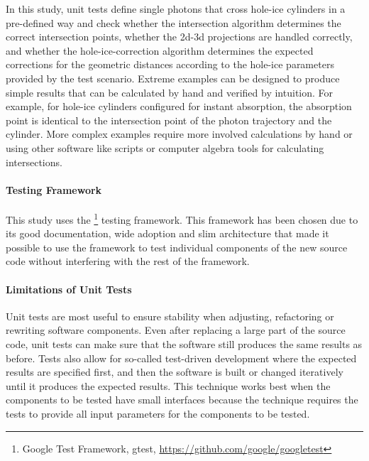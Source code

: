 In this study, unit tests define single photons that cross hole-ice cylinders in a pre-defined way and check whether the intersection algorithm determines the correct intersection points, whether the 2d-3d projections are handled correctly, and whether the hole-ice-correction algorithm determines the expected corrections for the geometric distances according to the hole-ice parameters provided by the test scenario.
Extreme examples can be designed to produce simple results that can be calculated by hand and verified by intuition. For example, for hole-ice cylinders configured for instant absorption, the absorption point is identical to the intersection point of the photon trajectory and the cylinder.
More complex examples require more involved calculations by hand or using other software like  scripts or computer algebra tools for calculating intersections.



\paragraph{Testing Framework}
This study uses the \footnote{Google Test Framework, gtest, \url{https://github.com/google/googletest}} testing framework.
This framework has been chosen due to its good documentation, wide adoption and slim architecture that made it possible to use the framework to test individual components of the new source code without interfering with the rest of the \icesim framework.


\paragraph{Limitations of Unit Tests}
Unit tests are most useful to ensure stability when adjusting, refactoring or rewriting software components. Even after replacing a large part of the source code, unit tests can make sure that the software still produces the same results as before.
Tests also allow for so-called test-driven development where the expected results are specified first, and then the software is built or changed iteratively until it produces the expected results.
This technique works best when the components to be tested have small interfaces because the technique requires the tests to provide all input parameters for the components to be tested.

